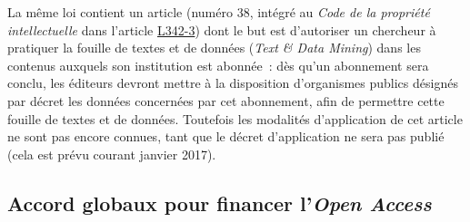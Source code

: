 La m{\^e}me loi contient un article (num{\'e}ro 38, int{\'e}gr{\'e} au \emph{Code de la propri{\'e}t{\'e} intellectuelle} dans l'article
\href{https://www.legifrance.gouv.fr/affichCodeArticle.do;jsessionid=6B4C28C0CE24D0F735EB9C7F3B081B16.tpdila15v_3?cidTexte=LEGITEXT000006069414&idArticle=LEGIARTI000033219347&dateTexte=20170124&categorieLien=cid#LEGIARTI000033219347}{L342-3})
dont le but est d'autoriser un chercheur {\`a} pratiquer la fouille de textes et de donn{\'e}es (\emph{Text \& Data Mining})
dans les contenus auxquels son institution est abonn{\'e}e~:  d{\`e}s qu'un abonnement sera conclu, les {\'e}diteurs devront mettre {\`a} la disposition d'organismes publics
d{\'e}sign{\'e}s par d{\'e}cret les donn{\'e}es concern{\'e}es par cet abonnement, afin de permettre cette fouille de textes et de donn{\'e}es. Toutefois les modalit{\'e}s d'application
de cet article ne sont pas encore connues, tant que le d{\'e}cret d'application ne sera pas publi{\'e} (cela est pr{\'e}vu courant janvier 2017).

\subsection{Accord globaux pour financer l'\emph{Open Access}}

